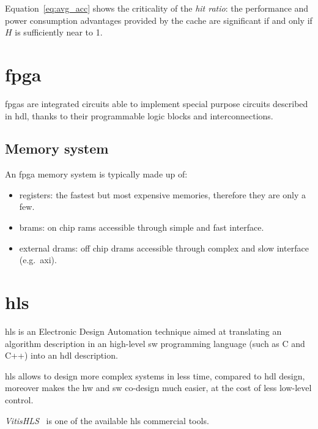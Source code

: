 \documentclass[11pt,a4paper,oneside]{memoir}
\begin{document}
Equation~\ref{eq:avg_acc} shows the criticality of the \emph{hit ratio}: the
performance and power consumption advantages provided by the cache are
significant if and only if $H$ is sufficiently near to 1.

\section{\acl{fpga}}
\aclp{fpga} are integrated circuits able to implement special purpose circuits
described in \ac{hdl}, thanks to their programmable logic blocks and
interconnections.
\subsection{Memory system}
An \ac{fpga} memory system is typically made up of:
\begin{itemize}
	\item registers: the fastest but most expensive memories, therefore
		they are only a few.
	\item \acp{bram}: on chip \acp{ram} accessible through simple and fast
		interface.
	\item external \acp{dram}: off chip \acp{dram} accessible through
		complex and slow interface (e.g.\ \acs{axi}).
\end{itemize}

\section{\acl{hls}}
\acf{hls} is an Electronic Design Automation technique aimed at translating an
algorithm description in an high-level \acl{sw} programming language (such as C
and C++) into an \ac{hdl} description.

\ac{hls} allows to design more complex systems in less time, compared to
\ac{hdl} design, moreover makes the \acl{hw} and \acl{sw} co-design much
easier, at the cost of less low-level control.


\emph{Vitis\texttrademark HLS}~\cite{vitisug} is one of the available \ac{hls}
commercial tools.
\end{document}
